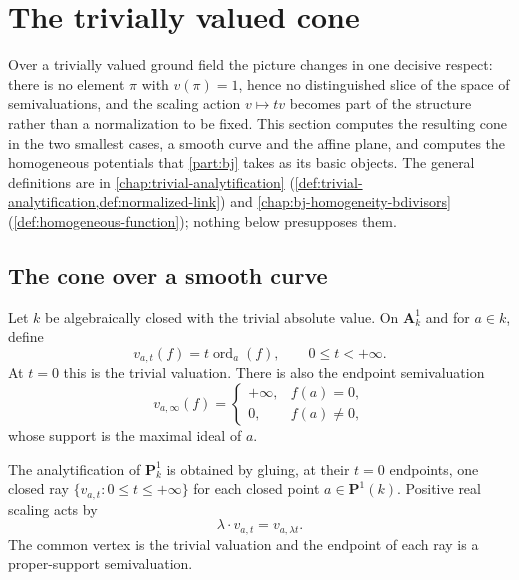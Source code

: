 \section{The trivially valued cone}
\label{sec:trivial-valuation-cone}

Over a trivially valued ground field the picture changes in one decisive
respect: there is no element $\pi$ with $v(\pi)=1$, hence no distinguished
slice of the space of semivaluations, and the scaling action
$v\mapsto tv$ becomes part of the structure rather than a normalization to be
fixed.  This section computes the resulting cone in the two smallest cases,
a smooth curve and the affine plane, and computes the homogeneous potentials
that \cref{part:bj} takes as its basic objects.  The general definitions are
in \cref{chap:trivial-analytification}
(\cref{def:trivial-analytification,def:normalized-link}) and
\cref{chap:bj-homogeneity-bdivisors}
(\cref{def:homogeneous-function}); nothing below presupposes them.

\subsection{The cone over a smooth curve}
\label{sec:ch08-trivial-curve}

Let $k$ be algebraically closed with the trivial absolute value.  On
$\mathbf A^1_k$ and for $a\in k$, define
\[
 v_{a,t}(f)=t\operatorname{ord}_a(f),\qquad 0\leq t<+\infty.
\]
At $t=0$ this is the trivial valuation.  There is also the endpoint
semivaluation
\[
 v_{a,\infty}(f)=
 \begin{cases}
  +\infty,&f(a)=0,\\
  0,&f(a)\neq0,
 \end{cases}
\]
whose support is the maximal ideal of $a$.

\begin{proposition}\label{prop:trivial-p1-tree}
The analytification of $\mathbf P^1_k$ is obtained by gluing, at their
$t=0$ endpoints, one closed ray
$\{v_{a,t}:0\leq t\leq+\infty\}$ for each closed point
$a\in\mathbf P^1(k)$.  Positive real scaling acts by
\[
                         \lambda\cdot v_{a,t}=v_{a,\lambda t}.
\]
The common vertex is the trivial valuation and the endpoint of each ray is a
proper-support semivaluation.
\end{proposition}


